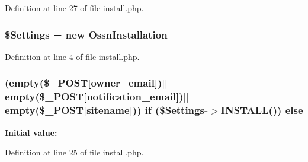 Definition at line 27 of file install.\+php.

\subsubsection[{\texorpdfstring{\$\+Settings}{$Settings}}]{\setlength{\rightskip}{0pt plus 5cm}\$Settings = new {\bf Ossn\+Installation}}\hypertarget{install_8php_a2c1da60c6cd872abbb042bcd58b7c10d}{}\label{install_8php_a2c1da60c6cd872abbb042bcd58b7c10d}


Definition at line 4 of file install.\+php.

\subsubsection[{\texorpdfstring{else}{else}}]{ (empty(\$\+\_\+\+P\+O\+ST\mbox{[}\textquotesingle{}owner\+\_\+email\textquotesingle{}\mbox{]})$\vert$$\vert$empty(\$\+\_\+\+P\+O\+ST\mbox{[}\textquotesingle{}notification\+\_\+email\textquotesingle{}\mbox{]})$\vert$$\vert$empty(\$\+\_\+\+P\+O\+ST\mbox{[}\textquotesingle{}sitename\textquotesingle{}\mbox{]})) {\bf if} (\$Settings-\/$>$I\+N\+S\+T\+A\+LL()) else}\hypertarget{install_8php_a6207c145d0aa66335d74eeeef0b54fb7}{}\label{install_8php_a6207c145d0aa66335d74eeeef0b54fb7}
{\bfseries Initial value\+:}


Definition at line 25 of file install.\+php.

